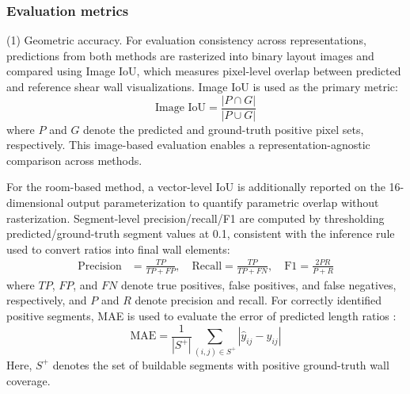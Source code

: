 \subsubsection{Evaluation metrics}

(1) Geometric accuracy. For evaluation consistency across representations, predictions from both methods are rasterized into binary layout images and compared using Image IoU, which measures pixel-level overlap between predicted and reference shear wall visualizations. Image IoU is used as the primary metric:
\begin{equation}
\text{Image IoU}=\frac{|P\cap G|}{|P\cup G|}
\end{equation}
where $P$ and $G$ denote the predicted and ground-truth positive pixel sets, respectively. This image-based evaluation enables a representation-agnostic comparison across methods.

For the room-based method, a vector-level IoU is additionally reported on the 16-dimensional output parameterization to quantify parametric overlap without rasterization. Segment-level precision/recall/F1 are computed by thresholding predicted/ground-truth segment values at 0.1, consistent with the inference rule used to convert ratios into final wall elements:
\begin{align*}
\text{Precision}&=\frac{TP}{TP+FP}, \quad
\text{Recall}=\frac{TP}{TP+FN}, \quad
\text{F1}=\frac{2PR}{P+R}
\end{align*}
where $TP$, $FP$, and $FN$ denote true positives, false positives, and false negatives, respectively, and $P$ and $R$ denote precision and recall.
For correctly identified positive segments, MAE is used to evaluate the error of predicted length ratios \cite{Chai_2014}:
\begin{equation}
\text{MAE}=\frac{1}{|S^+|}\sum_{(i,j)\in S^+}|\hat y_{ij}-y_{ij}|
\end{equation}
Here, $S^+$ denotes the set of buildable segments with positive ground-truth wall coverage.

